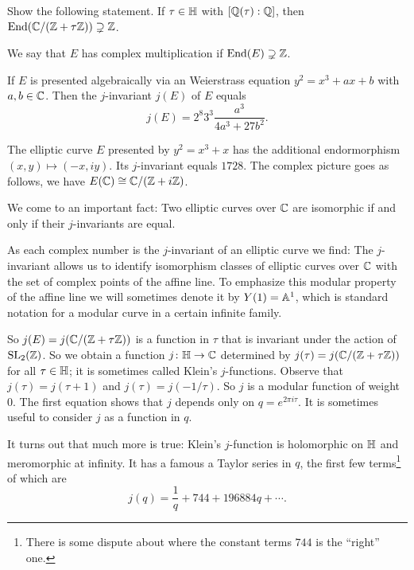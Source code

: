 \begin{exercise}
  Show the following statement. If $\tau \in{\mathbb{H}}$  with
  $[{\mathbb{Q}}(\tau):{\mathbb{Q}}]$, then $\mathrm{End}({\mathbb{C}}/({\mathbb{Z}}+\tau {\mathbb{Z}}))\supsetneq
  {\mathbb{Z}}$. 
\end{exercise}

\begin{definition}
  We say that $E$ has complex multiplication if
  $\mathrm{End}(E)\supsetneq {\mathbb{Z}}$. 
\end{definition}

If $E$ is presented algebraically via an Weierstrass equation $y^2 =
x^3+ax+b$ with $a,b\in{\mathbb{C}}$. Then the $j$-invariant $j(E)$ of $E$ equals
\begin{equation*}
  j(E) = 2^8 3^3 \frac{a^3}{4a^3+27b^2}. 
\end{equation*}

\begin{example}
  The elliptic curve $E$ presented by $y^2=x^3+x$ has the additional
  endormorphism
  $(x,y)\mapsto (-x, i y)$. Its $j$-invariant equals $1728$. The
  complex picture goes as follows, we have $E({\mathbb{C}})\cong {\mathbb{C}}/({\mathbb{Z}}+i
  {\mathbb{Z}})$. 
\end{example}

We come to an important fact: Two elliptic curves over ${\mathbb{C}}$ are
isomorphic if and only if their $j$-invariants are equal.

As each complex number is the $j$-invariant of an elliptic curve we
find: The $j$-invariant allows us to identify isomorphism classes of
elliptic curves over ${\mathbb{C}}$ with the set of complex points of the
affine line. To emphasize this modular property of the affine line we
will sometimes denote it by $Y(1)={\mathbb{A}}^1$, which is standard notation
for a modular curve in a certain infinite family.

So $j(E) = j({\mathbb{C}}/({\mathbb{Z}}+\tau{\mathbb{Z}}))$ is a function in $\tau$ that is
invariant under the action of $\mathrm{SL}_2({\mathbb{Z}})$. So we obtain a
function $j\colon {\mathbb{H}}\rightarrow {\mathbb{C}}$ determined by $j(\tau) =
j({\mathbb{C}}/({\mathbb{Z}}+\tau{\mathbb{Z}}))$ for all $\tau\in{\mathbb{H}}$; it is sometimes called
Klein's $j$-functions. Observe that $j(\tau)=j(\tau+1)$ and $j(\tau) =
j(-1/\tau)$. So $j$ is a modular function of weight $0$. The first
equation shows that $j$ depends only on $q=e^{2\pi i \tau}$. It is
sometimes useful to consider $j$ as a function in $q$.

It turns out that much more is true: Klein's $j$-function is
holomorphic on ${\mathbb{H}}$ and meromorphic at infinity. It has a famous 
a Taylor series in $q$, the first few terms\footnote{There is some
  dispute about where the constant terms $744$ is the ``right'' one.} of which are 
\begin{equation*}
  j(q) = \frac 1q + 744 + 196884q +\cdots. 
\end{equation*}

